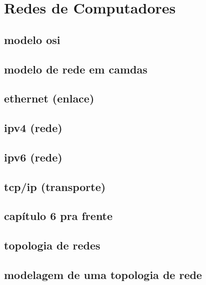 \section{Redes de Computadores}

    \subsection{modelo osi}
    \subsection{modelo de rede em camdas}
    \subsection{ethernet (enlace)}
    \subsection{ipv4 (rede)}
    \subsection{ipv6 (rede)}
    \subsection{tcp/ip (transporte)}
    \subsection{capítulo 6 pra frente}
    \subsection{topologia de redes}
    \subsection{modelagem de uma topologia de rede}